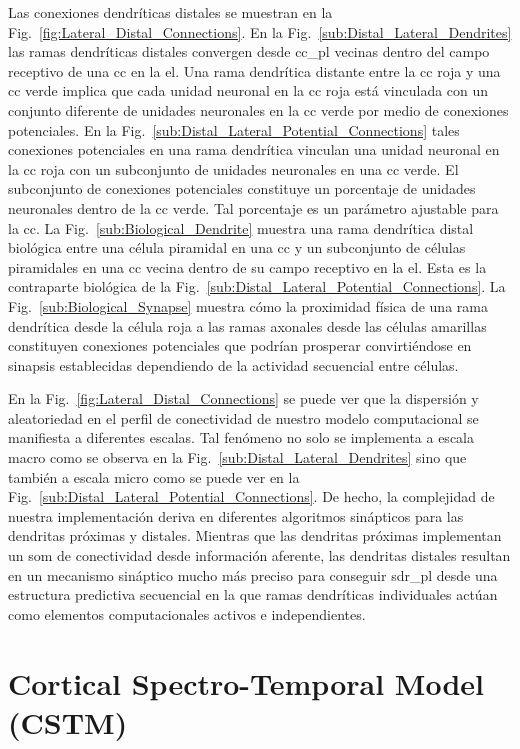 {Las conexiones dendríticas distales se muestran en la Fig.~\ref{fig:Lateral_Distal_Connections}.
En la Fig.~\ref{sub:Distal_Lateral_Dendrites} las ramas dendríticas distales convergen desde \gls{cc_pl} vecinas dentro del campo receptivo de una \gls{cc} en la \gls{el}.
Una rama dendrítica distante entre la \gls{cc} roja y una \gls{cc} verde implica que cada unidad neuronal en la \gls{cc} roja está vinculada con un conjunto diferente de unidades neuronales en la \gls{cc} verde por medio de conexiones potenciales.
En la Fig.~\ref{sub:Distal_Lateral_Potential_Connections} tales conexiones potenciales en una rama dendrítica vinculan una unidad neuronal en la \gls{cc} roja con un subconjunto de unidades neuronales en una \gls{cc} verde.
El subconjunto de conexiones potenciales constituye un porcentaje de unidades neuronales dentro de la \gls{cc} verde.
Tal porcentaje es un parámetro ajustable para la \gls{cc}.
La Fig.~\ref{sub:Biological_Dendrite} muestra una rama dendrítica distal biológica entre una célula piramidal en una \gls{cc} y un subconjunto de células piramidales en una \gls{cc} vecina dentro de su campo receptivo en la \gls{el}.
Esta es la contraparte biológica de la Fig.~\ref{sub:Distal_Lateral_Potential_Connections}.
La Fig.~\ref{sub:Biological_Synapse} muestra cómo la proximidad física de una rama dendrítica desde la célula roja a las ramas axonales desde las células amarillas constituyen conexiones potenciales que podrían prosperar convirtiéndose en sinapsis establecidas dependiendo de la actividad secuencial entre células.

En la Fig.~\ref{fig:Lateral_Distal_Connections} se puede ver que la dispersión y aleatoriedad en el perfil de conectividad de nuestro modelo computacional se manifiesta a diferentes escalas.
Tal fenómeno no solo se implementa a escala macro como se observa en la Fig.~\ref{sub:Distal_Lateral_Dendrites} sino que también a escala micro como se puede ver en la Fig.~\ref{sub:Distal_Lateral_Potential_Connections}.
De hecho, la complejidad de nuestra implementación deriva en diferentes algoritmos sinápticos para las dendritas próximas y distales.
Mientras que las dendritas próximas implementan un \gls{som} de conectividad desde información aferente, las dendritas distales resultan en un mecanismo sináptico mucho más preciso para conseguir \gls{sdr_pl} desde una estructura predictiva secuencial en la que ramas dendríticas individuales actúan como elementos computacionales activos e independientes.
}{
\section{Cortical Spectro-Temporal Model (CSTM)}

}
